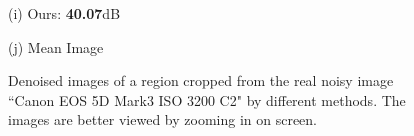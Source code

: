 \documentclass[10pt,onecolumn,letterpaper]{article}
\begin{document}
\begin{figure}[H]
{\begin{minipage}[t]{0.195\textwidth}
{\footnotesize (i) Ours: \textbf{40.07}dB  }
\end{minipage}
\begin{minipage}[t]{0.195\textwidth}
\centering
{}
{\footnotesize (j) Mean Image \cite{crosschannel2016} }
\end{minipage}
}
\caption{Denoised images of a region cropped from the real noisy image ``Canon EOS 5D Mark3 ISO 3200 C2" \cite{crosschannel2016} by different methods. The images are better viewed by zooming in on screen.} 
\label{fig11}
\end{figure}
\end{document}
